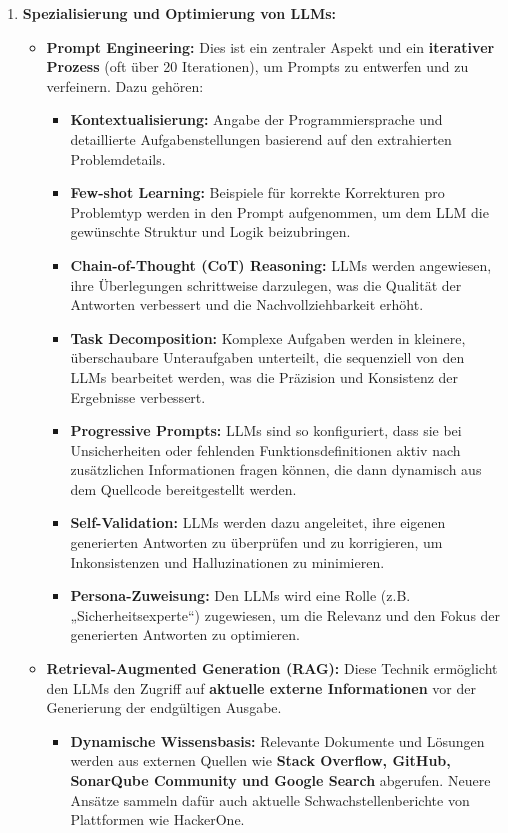 \begin{enumerate}
    \item \textbf{Spezialisierung und Optimierung von LLMs:}
    \begin{itemize}
        \item \textbf{Prompt Engineering:} Dies ist ein zentraler Aspekt und ein \textbf{iterativer Prozess} (oft über 20 Iterationen), um Prompts zu entwerfen und zu verfeinern. Dazu gehören:
        \begin{itemize}
            \item \textbf{Kontextualisierung:} Angabe der Programmiersprache und detaillierte Aufgabenstellungen basierend auf den extrahierten Problemdetails.
            \item \textbf{Few-shot Learning:} Beispiele für korrekte Korrekturen pro Problemtyp werden in den Prompt aufgenommen, um dem LLM die gewünschte Struktur und Logik beizubringen.
            \item \textbf{Chain-of-Thought (CoT) Reasoning:} LLMs werden angewiesen, ihre Überlegungen schrittweise darzulegen, was die Qualität der Antworten verbessert und die Nachvollziehbarkeit erhöht.
            \item \textbf{Task Decomposition:} Komplexe Aufgaben werden in kleinere, überschaubare Unteraufgaben unterteilt, die sequenziell von den LLMs bearbeitet werden, was die Präzision und Konsistenz der Ergebnisse verbessert.
            \item \textbf{Progressive Prompts:} LLMs sind so konfiguriert, dass sie bei Unsicherheiten oder fehlenden Funktionsdefinitionen aktiv nach zusätzlichen Informationen fragen können, die dann dynamisch aus dem Quellcode bereitgestellt werden.
            \item \textbf{Self-Validation:} LLMs werden dazu angeleitet, ihre eigenen generierten Antworten zu überprüfen und zu korrigieren, um Inkonsistenzen und Halluzinationen zu minimieren.
            \item \textbf{Persona-Zuweisung:} Den LLMs wird eine Rolle (z.B. „Sicherheitsexperte“) zugewiesen, um die Relevanz und den Fokus der generierten Antworten zu optimieren.
        \end{itemize}
        \item \textbf{Retrieval-Augmented Generation (RAG):} Diese Technik ermöglicht den LLMs den Zugriff auf \textbf{aktuelle externe Informationen} vor der Generierung der endgültigen Ausgabe.
        \begin{itemize}
            \item \textbf{Dynamische Wissensbasis:} Relevante Dokumente und Lösungen werden aus externen Quellen wie \textbf{Stack Overflow, GitHub, SonarQube Community und Google Search} abgerufen. Neuere Ansätze sammeln dafür auch aktuelle Schwachstellenberichte von Plattformen wie HackerOne.

\end{itemize}
\end{itemize}
\end{enumerate}
